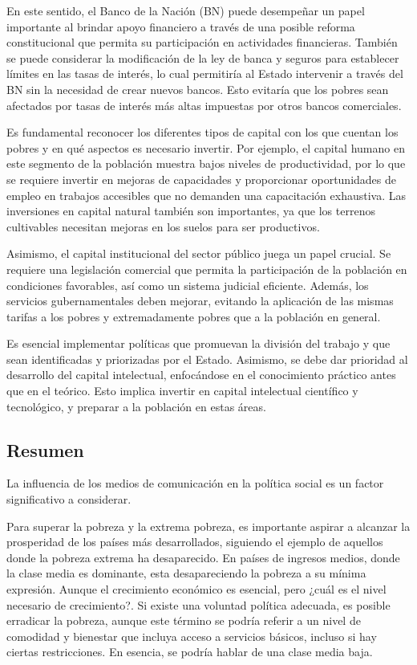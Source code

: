 \documentclass[
  jou,
  floatsintext,
  longtable,
  a4paper,
  nolmodern,
  notxfonts,
  notimes,
  12pt,
  colorlinks=true,linkcolor=blue,citecolor=blue,urlcolor=blue]{apa7}
\begin{document}
En este sentido, el Banco de la Nación (BN) puede desempeñar un papel
importante al brindar apoyo financiero a través de una posible reforma
constitucional que permita su participación en actividades financieras.
También se puede considerar la modificación de la ley de banca y seguros
para establecer límites en las tasas de interés, lo cual permitiría al
Estado intervenir a través del BN sin la necesidad de crear nuevos
bancos. Esto evitaría que los pobres sean afectados por tasas de interés
más altas impuestas por otros bancos comerciales.

Es fundamental reconocer los diferentes tipos de capital con los que
cuentan los pobres y en qué aspectos es necesario invertir. Por ejemplo,
el capital humano en este segmento de la población muestra bajos niveles
de productividad, por lo que se requiere invertir en mejoras de
capacidades y proporcionar oportunidades de empleo en trabajos
accesibles que no demanden una capacitación exhaustiva. Las inversiones
en capital natural también son importantes, ya que los terrenos
cultivables necesitan mejoras en los suelos para ser productivos.

Asimismo, el capital institucional del sector público juega un papel
crucial. Se requiere una legislación comercial que permita la
participación de la población en condiciones favorables, así como un
sistema judicial eficiente. Además, los servicios gubernamentales deben
mejorar, evitando la aplicación de las mismas tarifas a los pobres y
extremadamente pobres que a la población en general.

Es esencial implementar políticas que promuevan la división del trabajo
y que sean identificadas y priorizadas por el Estado. Asimismo, se debe
dar prioridad al desarrollo del capital intelectual, enfocándose en el
conocimiento práctico antes que en el teórico. Esto implica invertir en
capital intelectual científico y tecnológico, y preparar a la población
en estas áreas.

\subsection{Resumen}\label{resumen-1}

La influencia de los medios de comunicación en la política social es un
factor significativo a considerar.

Para superar la pobreza y la extrema pobreza, es importante aspirar a
alcanzar la prosperidad de los países más desarrollados, siguiendo el
ejemplo de aquellos donde la pobreza extrema ha desaparecido. En países
de ingresos medios, donde la clase media es dominante, esta
desapareciendo la pobreza a su mínima expresión. Aunque el crecimiento
económico es esencial, pero ¿cuál es el nivel necesario de crecimiento?.
Si existe una voluntad política adecuada, es posible erradicar la
pobreza, aunque este término se podría referir a un nivel de comodidad y
bienestar que incluya acceso a servicios básicos, incluso si hay ciertas
restricciones. En esencia, se podría hablar de una clase media baja.
\end{document}
